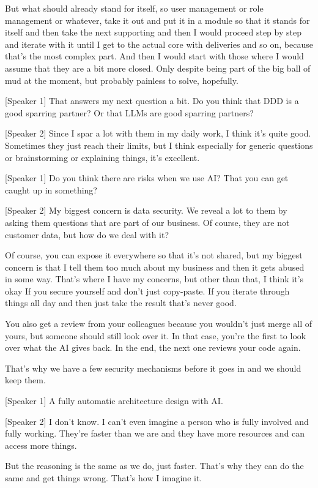 But what should already stand for itself, so user management or role management or whatever, take it out and put it in a module so that it stands for itself and then take the next supporting and then I would proceed step by step and iterate with it until I get to the actual core with deliveries and so on, because that's the most complex part. And then I would start with those where I would assume that they are a bit more closed. Only despite being part of the big ball of mud at the moment, but probably painless to solve, hopefully.

[Speaker 1]
That answers my next question a bit. Do you think that DDD is a good sparring partner? Or that LLMs are good sparring partners?

[Speaker 2]
Since I spar a lot with them in my daily work, I think it's quite good. Sometimes they just reach their limits, but I think especially for generic questions or brainstorming or explaining things, it's excellent.

[Speaker 1]
Do you think there are risks when we use AI? That you can get caught up in something?

[Speaker 2]
My biggest concern is data security. We reveal a lot to them by asking them questions that are part of our business. Of course, they are not customer data, but how do we deal with it?

Of course, you can expose it everywhere so that it's not shared, but my biggest concern is that I tell them too much about my business and then it gets abused in some way. That's where I have my concerns, but other than that, I think it's okay If you secure yourself and don't just copy-paste. If you iterate through things all day and then just take the result that's never good.

You also get a review from your colleagues because you wouldn't just merge all of yours, but someone should still look over it. In that case, you're the first to look over what the AI gives back. In the end, the next one reviews your code again.

That's why we have a few security mechanisms before it goes in and we should keep them.

[Speaker 1]
A fully automatic architecture design with AI.

[Speaker 2]
I don't know. I can't even imagine a person who is fully involved and fully working. They're faster than we are and they have more resources and can access more things.

But the reasoning is the same as we do, just faster. That's why they can do the same and get things wrong. That's how I imagine it.

